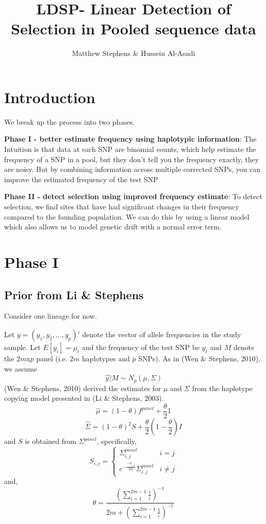 \documentclass[10pt,a4paper,draft]{article}
\title{LDSP- Linear Detection of Selection in Pooled sequence data}
\date{}
\author{Matthew Stephens \& Hussein Al-Asadi}
\begin{document}
\maketitle
\section{Introduction}
We break up the process into two phases.

\textbf{Phase I - better estimate frequency using haplotypic information}:
The Intuition is that data at each SNP are binomial counts, which help estimate the frequency of a SNP in a pool, but they don't
tell you the frequency exactly, they are noisy. But by combining information across multiple corrected SNPs, you can improve the estimated frequency of the test SNP

\textbf{Phase II - detect selection using improved frequency estimate}:
To detect selection, we find sites that have had significant changes in their frequency compared to the founding population. We can do this by using a linear model which also allows us to model genetic drift with a normal error term.

\section{Phase I}
\subsection{Prior from Li \& Stephens}
Consider one lineage for now.

Let  $y = (y_1, y_2, ..., y_p)'$ denote the vector of allele frequencies in the study sample.
Let $E[y_{i}] = \mu_{i}$ and the frequency of the test SNP be $y_{t}$  and $M$ denote the $2m$x$p$ panel (i.e. $2m$ haplotypes and $p$ SNPs). As in (Wen \& Stephens, 2010), we assume 
\begin{equation}
\vec{y} |M \sim N_p(\mu, \Sigma) \label{eq:prior}
\end{equation}
(Wen \& Stephens, 2010) derived the estimates for $\mu$ and $\Sigma$ from the haplotype copying model presented in (Li \& Stephens, 2003).
\begin{equation}
\hat{\mu} = (1-\theta)f^{panel} + \frac{\theta}{2}1 
\end{equation}
\begin{equation}
\hat{\Sigma} = (1-\theta)^2S + \frac{\theta}{2}(1-\frac{\theta}{2})I
\end{equation}
and $S$ is obtained from $\Sigma^{panel}$, specifically,
 \begin{equation}
   S_{i,j} = \left\{
     \begin{array}{lr}
       \Sigma_{i,j}^{panel} &  i =j\\
       e^{-\frac{-\rho_{i,j}}{2m}} \Sigma_{i,j}^{panel} &  i \neq j
     \end{array}
   \right.
\end{equation} 
and,
\begin{equation}
\theta = \frac{(\sum_{i=1}^{2m-1} \frac{1}{i})^{-1}}{2m + (\sum_{i=1}^{2m-1} \frac{1}{i})^{-1}}
\end{equation}
\end{document}
